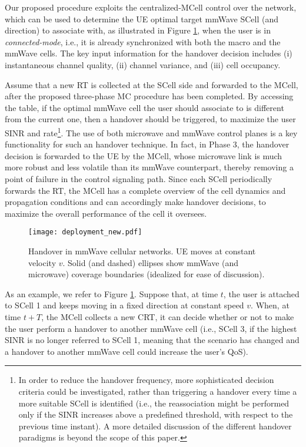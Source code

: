\documentclass[conference,a4paper]{IEEEtran}
\begin{document}
Our proposed procedure exploits the centralized-MCell control over the network, which can be used to determine the UE optimal target mmWave SCell (and direction) to associate with, as illustrated in Figure \ref{fig:HO}, when the user is in \emph{connected-mode}, i.e., it is already synchronized with both the macro and the mmWave cells. The key input information for the handover decision includes (i) instantaneous channel quality, (ii)  channel variance, and (iii) cell occupancy.

Assume that a new RT is collected at the SCell side and forwarded to the MCell, after the proposed three-phase MC procedure has been completed. 
By accessing the table, if the optimal mmWave cell the user should associate to is different from the current one, then a handover should be triggered, to maximize the user SINR and rate\footnote{In order to reduce the handover frequency, more sophisticated decision criteria could be investigated, rather than triggering a handover every time a more suitable SCell is identified (i.e., the reassociation might be performed only if the SINR increases above a predefined threshold, with respect to the previous time instant). A more detailed discussion of the different handover paradigms is beyond the scope of this paper.}. 
The use of both microwave and mmWave control planes is a key functionality for such an handover technique. 
In fact, in Phase 3, the handover decision is forwarded to the UE by the MCell, whose microwave link is much more robust and less volatile than its mmWave counterpart, thereby removing a point of failure in the control signaling path. Since each SCell periodically forwards the RT, the MCell has a complete overview of the cell dynamics and propagation conditions and can accordingly make handover decisions, to maximize the overall performance of the cell it oversees.

\begin{figure}[t!]
\centering
 \texttt{[image: deployment\_new.pdf]}
 \caption{Handover in mmWave cellular networks. UE moves at constant velocity $v$. Solid (and dashed) ellipses show mmWave (and microwave) coverage boundaries (idealized for ease of  discussion).}
 \vspace{-0.6cm}
 \label{fig:HO}
\end{figure}

As an example, we refer to Figure \ref{fig:HO}. Suppose that, at time $t$, the user is attached to SCell 1 and keeps moving in a fixed direction at constant speed $v$. When, at time $t + T$, the MCell collects a new CRT, it can decide whether or not to make the user perform a handover to another mmWave cell (i.e., SCell 3, if the highest SINR is no longer referred to SCell 1, meaning that the scenario has changed and a handover to another mmWave cell could increase the user's QoS).
\end{document}
